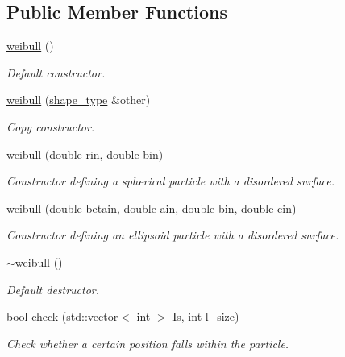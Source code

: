 \subsection*{Public Member Functions}
\begin{DoxyCompactItemize}
\item 
\hyperlink{classparticle_1_1shape_1_1weibull_a6171e8485c445df5322b61bc4bd4d360}{weibull} ()
\begin{DoxyCompactList}\small\item\em Default constructor. \end{DoxyCompactList}\item 
\hyperlink{classparticle_1_1shape_1_1weibull_a4a30c2bc444fddc10e53331693b1b696}{weibull} (\hyperlink{classparticle_1_1shape_1_1shape__type}{shape\+\_\+type} \&other)
\begin{DoxyCompactList}\small\item\em Copy constructor. \end{DoxyCompactList}\item 
\hyperlink{classparticle_1_1shape_1_1weibull_ae3ea5c72d6cb62ba72308ed831bbc82d}{weibull} (double rin, double bin)
\begin{DoxyCompactList}\small\item\em Constructor defining a spherical particle with a disordered surface. \end{DoxyCompactList}\item 
\hyperlink{classparticle_1_1shape_1_1weibull_a63137884cacc8ab5df125ba862f79262}{weibull} (double betain, double ain, double bin, double cin)
\begin{DoxyCompactList}\small\item\em Constructor defining an ellipsoid particle with a disordered surface. \end{DoxyCompactList}\item 
\hyperlink{classparticle_1_1shape_1_1weibull_a02613f15cab64462293ff787c35fafb1}{$\sim$weibull} ()
\begin{DoxyCompactList}\small\item\em Default destructor. \end{DoxyCompactList}\item 
bool \hyperlink{classparticle_1_1shape_1_1weibull_a22612311ce2f3ca4317f8263e52de425}{check} (std\+::vector$<$ int $>$ Is, int l\+\_\+size)
\begin{DoxyCompactList}\small\item\em Check whether a certain position falls within the particle. \end{DoxyCompactList}\item 

\end{DoxyCompactItemize}
